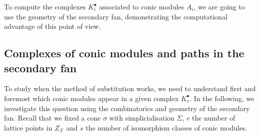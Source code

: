 \documentclass[reqno, 12pt]{amsart}
\theoremstyle{definition}
\numberwithin{equation}{section}
\begin{document}
To compute the complexes $K_i^\bullet$ associated to conic modules $A_i$, we are going to use the geometry of the secondary fan, demonstrating the computational advantage of this point of view.



\subsection{Complexes of conic modules and paths in the secondary fan}

To study when the method of substitution works, we need to understand first and foremost which conic modules appear in a given complex $K_v^\bullet$. In the following, we investigate this question using the combinatorics and geometry of the secondary fan.
Recall that we fixed a cone $\sigma$ with simplicialisation $\Sigma$, $r$ the number of lattice points in $Z_\mathcal{X}$ and $s$ the number of isomorphism classes of conic modules.
\end{document}
